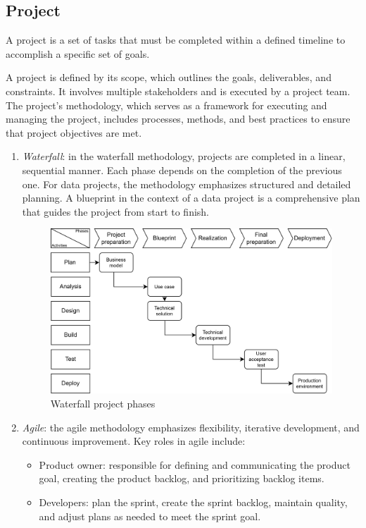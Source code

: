 \subsection{Project}
\begin{definition}
    A project is a set of tasks that must be completed within a defined timeline to accomplish a specific set of goals.
\end{definition}
\noindent A project is defined by its scope, which outlines the goals, deliverables, and constraints. 
    It involves multiple stakeholders and is executed by a project team. 
    The project's methodology, which serves as a framework for executing and managing the project, includes processes, methods, and best practices to ensure that project objectives are met.
\begin{enumerate}
    \item \textit{Waterfall}: in the waterfall methodology, projects are completed in a linear, sequential manner. 
        Each phase depends on the completion of the previous one. 
        For data projects, the methodology emphasizes structured and detailed planning.
        A blueprint in the context of a data project is a comprehensive plan that guides the project from start to finish.
        \begin{figure}[H]
            \centering
            \includegraphics[width=0.5\linewidth]{images/bis8.png}
            \caption{Waterfall project phases}
        \end{figure}
    \item \textit{Agile}: the agile methodology emphasizes flexibility, iterative development, and continuous improvement. 
        Key roles in agile include:
        \begin{itemize}
            \item Product owner: responsible for defining and communicating the product goal, creating the product backlog, and prioritizing backlog items.
            \item Developers: plan the sprint, create the sprint backlog, maintain quality, and adjust plans as needed to meet the sprint goal.

\end{itemize}
\end{enumerate}
